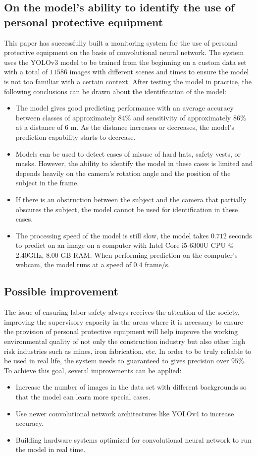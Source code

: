 \documentclass[conference]{IEEEtran}
\begin{document}
\subsection{On the model's ability to identify the use of personal protective equipment}
This paper has successfully built a monitoring system for the use of personal protective equipment on the basis of convolutional neural network. The system uses the YOLOv3 model to be trained from the beginning on a custom data set with a total of $ 11586 $ images with different scenes and times to ensure the model is not too familiar with a certain context. After testing the model in practice, the following conclusions can be drawn about the identification of the model:
\begin{itemize}
	\item The model gives good predicting performance with an average accuracy between classes of approximately $ 84 \% $ and sensitivity of approximately $ 86 \% $ at a distance of $ 6 $ m. As the distance increases or decreases, the model's prediction capability starts to decrease.
	\item Models can be used to detect cases of misuse of hard hats, safety vests, or masks. However, the ability to identify the model in these cases is limited and depends heavily on the camera's rotation angle and the position of the subject in the frame.
	\item If there is an obstruction between the subject and the camera that partially obscures the subject, the model cannot be used for identification in these cases.
	\item The processing speed of the model is still slow, the model takes $ 0.712 $ seconds to predict on an image on a computer with Intel Core i5-6300U CPU @ 2.40GHz, 8.00 GB RAM. When performing prediction on the computer's webcam, the model runs at a speed of $ 0.4 $ frame/s.
\end{itemize}

\subsection{Possible improvement}
The issue of ensuring labor safety always receives the attention of the society, improving the supervisory capacity in the areas where it is necessary to ensure the provision of personal protective equipment will help improve the working environmental quality of not only the construction industry but also other high risk industries such as mines, iron fabrication, etc. In order to be truly reliable to be used in real life, the system needs to guaranteed to gives precision over $ 95 \% $. To achieve this goal, several improvements can be applied:
\begin{itemize}
	\item Increase the number of images in the data set with different backgrounds so that the model can learn more special cases.
	\item Use newer convolutional network architectures like YOLOv4 to increase accuracy.
	\item Building hardware systems optimized for convolutional neural network to run the model in real time.
\end{itemize}

\newpage

\end{document}
